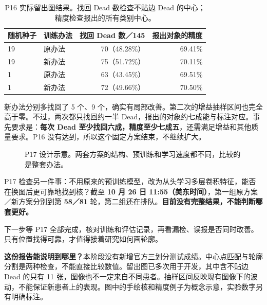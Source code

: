 \documentclass[UTF8,zihao=-4,fontset=windows]{ctexart}
\begin{document}
\begin{table}[H]\centering\small
\begin{tabular}{llrr}\toprule
随机种子 & 训练办法 & 找回 Dead 数／145 & 报出对象的精度\\\midrule
19 & 原办法 & 70（48.28\%） & 69.41\%\\
19 & 新办法 & 75（51.72\%） & 70.11\%\\
1 & 原办法 & 63（43.45\%） & 69.51\%\\
1 & 新办法 & 72（49.66\%） & 70.50\%\\\bottomrule
\end{tabular}
\caption{P16 实际留出图结果。找回 Dead 数检查不贴边 Dead 的中心；精度检查报出的所有类别中心。}
\end{table}

新办法分别多找回了 5 个、9 个，确实有局部改善。第二次的增益抽样区间也完全高于零。不过，两次都只找回约一半 Dead，报出的对象约七成能与标注对应。事先要求是：\textbf{每次 Dead 至少找回六成，精度至少七成五}，还需满足增益和其他质量要求。P16 没有达到，所以这个固定方案结束，不继续扩大。

\begin{figure}[H]\centering
{}
\caption{P17 设计示意。两套方案的结构、预训练和学习速度都不同，比较的是整套办法。}
\end{figure}

P17 检查另一件事：不用原来的预训练模型，改为从头学习多层卷积特征，能否在换图后更可靠地找到核？截至 \textbf{10 月 26 日 11:55（美东时间）}，第一组原方案／新方案分别到第 \textbf{58／81} 轮，第二组还在排队。\textbf{目前没有完整结果，不能判断哪套更好。}

下一步等 P17 全部完成，核对训练和评估记录，再看漏检、误报是否同时改善。只有位置找得可靠，才值得接着研究如何画轮廓。

\noindent\colorbox{pale}{\parbox{.95\linewidth}{\footnotesize
\textbf{这份报告能说明到哪里？}本阶段没有新增官方三划分测试成绩。中心点匹配与轮廓分割是两种检查，不能直接比较数值。留出图已多次用于开发，其中含不贴边 Dead 的只有 11 张，图像也不一定来自不同患者。抽样区间反映现有图像下的波动，不能保证新患者上的表现。图中的手绘核和精度例子为概念示意，实验数字另有明确标注。}}
\end{document}
